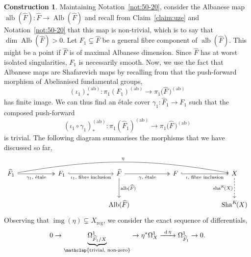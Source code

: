 \documentclass[JEP,XML,SOM,Unicode,published]{cedram}
\newcommand{\To}[1]{\mathchoice{\xrightarrow{\ts\kern4pt#1\kern3pt}}{\stackrel{#1}{\longrightarrow}}{}{}}
\let\ts\relax
\newcommand{\ab}{\mathrm{ab}}
\theoremstyle{plain}
\theoremstyle{definition}
\newtheorem{construction}[thm]{Construction}
\numberwithin{equation}{thm}
\numberwithin{enumi}{thm}
\DeclareMathOperator{\img}{img}
\newcommand{\reg}{\mathrm{reg}}
\DeclareMathOperator{\alb}{alb}
\DeclareMathOperator{\Alb}{Alb}
\DeclareMathOperator{\diff}{d}
\DeclareMathOperator{\sh}{sha}
\DeclareMathOperator{\Sh}{Sha}
\let\what\widehat
\begin{document}
\begin{construction}\label{cons:itAlb-s}
Maintaining Notation~\ref{not:50-20}, consider the Albanese map
$\alb(\what{F}) : \what{F} \to \Alb(\what{F})$ and recall from
Claim~\ref{claim:uze} and Notation~\ref{not:50-20} that this map is
non-trivial, which is to say that $\dim \Alb(\what{F}) > 0$. Let
$F_1 \subsetneq \what{F}$ be a general fibre component of $\alb(\what{F})$. This might
be a point if $\what{F}$ is of maximal Albanese dimension. Since $\what{F}$
has at worst isolated singularities, $F_1$ is necessarily smooth. Now, we use
the fact that Albanese maps are Shafarevich maps by recalling from
\cite[§0.1.3]{MR1341589} that the push-forward morphism of Abelianised
fundamental groups,
\[
(\iota_1)^{(\ab)}_* : \pi_1(F_1 )^{(\ab)} \to \pi_1\bigl(\what{F}\, \bigr)^{(\ab)}
\]
has finite image. We can thus find an étale cover $\gamma_1 : \what{F}_1 \to F_1$
such that the composed push-forward
\[
(\iota_1\circ \gamma_1)^{(\ab)}_* : \pi_1(\what{F}_1 )^{(\ab)} \to \pi_1\bigl(\what{F}\,
\bigr)^{(\ab)}
\]
is trivial. The following diagram summarises the morphisms that we have
discussed so far,
\[
\begin{tikzcd}[column sep=2cm, row sep=1cm]
\what{F}_1 \ar[rrrr, bend left=10, "\eta"] \ar[r, two heads, "\gamma_1\text{, étale}"'] & F_1 \ar[r, hook, "\iota_1\text{, fibre inclusion}"'] & \what{F} \ar[r, two heads, "\gamma\text{, étale}"'] \ar[d, "\alb(\what{F})"] & F \ar[r, hook, "\iota\text{, fibre inclusion}"'] & X \ar[d, dashed, "\sh^K\!(X)"'] \\
&& \Alb(\what{F}) && \Sh^K\!(X)
\end{tikzcd}
\]
Observing that $\img(\eta) \subsetneq X_{\reg}$, we consider the exact sequence of
differentials,
\begin{equation}\label{eq:trztu-s}
0 \to \underbrace{\Omega^1_{\what{F}_1/X}}_{\mathclap{\text{trivial,
non-zero}}} \to \eta^* \Omega^1_X \To{\diff\eta} \Omega^1_{\what{F}_1} \to0.
\end{equation}
\end{construction}
\end{document}
